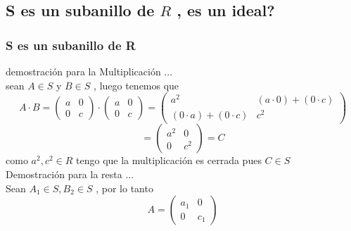 \documentclass[10pt,a4paper]{article} %
\begin{document}
        \subsection{S es un subanillo de $ R  $   , es un ideal?}
            \subsubsection{S es un subanillo de R}
                demostración para la Multiplicación ...
                \\
                sean $ A \in S  $  y $ B \in S  $ , luego tenemos que
                \begin{equation}
                    A \cdot B = \begin{pmatrix}
                        a & 0
                        \\
                        0 & c
                    \end{pmatrix}
                    \cdot \begin{pmatrix}
                        a & 0
                        \\
                        0 & c
                    \end{pmatrix}
                    =
                    \begin{pmatrix}
                        a ^{2} & (a \cdot 0) + (0 \cdot c)
                        \\
                        (0 \cdot a) + (0 \cdot c) & c ^{2}
                    \end{pmatrix}
                \end{equation}
                \begin{equation}
                     = \begin{pmatrix}
                        a ^{2} & 0
                        \\
                        0 & c ^{2}
                    \end{pmatrix}
                    = C
                \end{equation}
                como $ a ^{2} , c^{2} \in R    $ tengo que la multiplicación es
                cerrada pues $ C \in S  $
                \\
                Demostración para la resta ...
                \\
                Sean $ A_1 \in S , B_2 \in S  $ , por lo tanto
                \begin{equation}
                    A = \begin{pmatrix}
                        a_1  & 0
                        \\
                        0 & c_1
                    \end{pmatrix}
                \end{equation}
\end{document}
